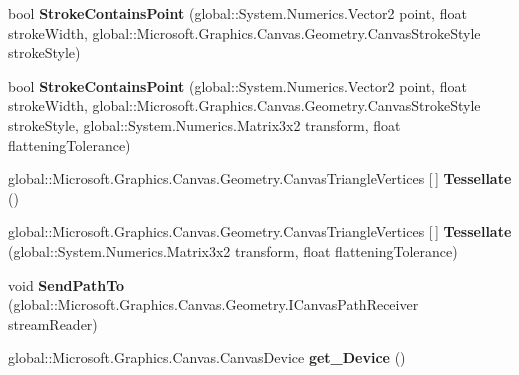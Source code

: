 \begin{DoxyCompactItemize}
bool {\bfseries Stroke\+Contains\+Point} (global\+::\+System.\+Numerics.\+Vector2 point, float stroke\+Width, global\+::\+Microsoft.\+Graphics.\+Canvas.\+Geometry.\+Canvas\+Stroke\+Style stroke\+Style)
\item 
\mbox{\label{interface_microsoft_1_1_graphics_1_1_canvas_1_1_geometry_1_1_i_canvas_geometry_a8c8e0234f10f24e16c5e23af24012c5a}} 
bool {\bfseries Stroke\+Contains\+Point} (global\+::\+System.\+Numerics.\+Vector2 point, float stroke\+Width, global\+::\+Microsoft.\+Graphics.\+Canvas.\+Geometry.\+Canvas\+Stroke\+Style stroke\+Style, global\+::\+System.\+Numerics.\+Matrix3x2 transform, float flattening\+Tolerance)
\item 
\mbox{\label{interface_microsoft_1_1_graphics_1_1_canvas_1_1_geometry_1_1_i_canvas_geometry_a3dc1c0c2642c9d24d0f9bae6c3181968}} 
global\+::\+Microsoft.\+Graphics.\+Canvas.\+Geometry.\+Canvas\+Triangle\+Vertices \mbox{[}$\,$\mbox{]} {\bfseries Tessellate} ()
\item 
\mbox{\label{interface_microsoft_1_1_graphics_1_1_canvas_1_1_geometry_1_1_i_canvas_geometry_a2f5903941962961821c79b2142291f25}} 
global\+::\+Microsoft.\+Graphics.\+Canvas.\+Geometry.\+Canvas\+Triangle\+Vertices \mbox{[}$\,$\mbox{]} {\bfseries Tessellate} (global\+::\+System.\+Numerics.\+Matrix3x2 transform, float flattening\+Tolerance)
\item 
\mbox{\label{interface_microsoft_1_1_graphics_1_1_canvas_1_1_geometry_1_1_i_canvas_geometry_a085e2ad8f4fb755784ee6b62d52ca3c1}} 
void {\bfseries Send\+Path\+To} (global\+::\+Microsoft.\+Graphics.\+Canvas.\+Geometry.\+I\+Canvas\+Path\+Receiver stream\+Reader)
\item 
\mbox{\label{interface_microsoft_1_1_graphics_1_1_canvas_1_1_geometry_1_1_i_canvas_geometry_a53a8c779859965ce77af229c8b35d7dd}} 
global\+::\+Microsoft.\+Graphics.\+Canvas.\+Canvas\+Device {\bfseries get\+\_\+\+Device} ()
\item 

\end{DoxyCompactItemize}
